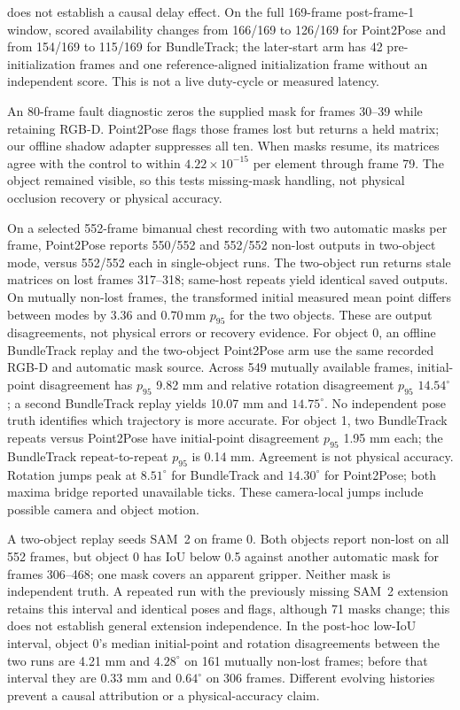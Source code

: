 \documentclass[10pt,journal]{IEEEtran}
\begin{document}
does not establish a causal delay effect. On the full 169-frame post-frame-1 window, scored availability changes from 166/169 to 126/169 for Point2Pose and from 154/169 to 115/169 for BundleTrack; the later-start arm has 42 pre-initialization frames and one reference-aligned initialization frame without an independent score. This is not a live duty-cycle or measured latency.

An 80-frame fault diagnostic zeros the supplied mask for frames 30--39 while retaining RGB-D. Point2Pose flags those frames lost but returns a held matrix; our offline shadow adapter suppresses all ten. When masks resume, its matrices agree with the control to within $4.22\times10^{-15}$ per element through frame 79. The object remained visible, so this tests missing-mask handling, not physical occlusion recovery or physical accuracy.

On a selected 552-frame bimanual chest recording with two automatic masks per frame, Point2Pose reports 550/552 and 552/552 non-lost outputs in two-object mode, versus 552/552 each in single-object runs. The two-object run returns stale matrices on lost frames 317--318; same-host repeats yield identical saved outputs. On mutually non-lost frames, the transformed initial measured mean point differs between modes by $3.36$ and $0.70\,\mathrm{mm}$ $p_{95}$ for the two objects. These are output disagreements, not physical errors or recovery evidence. For object 0, an offline BundleTrack replay and the two-object Point2Pose arm use the same recorded RGB-D and automatic mask source. Across 549 mutually available frames, initial-point disagreement has $p_{95}$ 9.82 mm and relative rotation disagreement $p_{95}$ $14.54^\circ$; a second BundleTrack replay yields 10.07 mm and $14.75^\circ$. No independent pose truth identifies which trajectory is more accurate. For object 1, two BundleTrack repeats versus Point2Pose have initial-point disagreement $p_{95}$ 1.95 mm each; the BundleTrack repeat-to-repeat $p_{95}$ is 0.14 mm. Agreement is not physical accuracy. Rotation jumps peak at $8.51^\circ$ for BundleTrack and $14.30^\circ$ for Point2Pose; both maxima bridge reported unavailable ticks. These camera-local jumps include possible camera and object motion.

A two-object replay seeds SAM~2 on frame 0. Both objects report non-lost on all 552 frames, but object 0 has IoU below 0.5 against another automatic mask for frames 306--468; one mask covers an apparent gripper. Neither mask is independent truth. A repeated run with the previously missing SAM~2 extension retains this interval and identical poses and flags, although 71 masks change; this does not establish general extension independence. In the post-hoc low-IoU interval, object 0's median initial-point and rotation disagreements between the two runs are 4.21 mm and $4.28^\circ$ on 161 mutually non-lost frames; before that interval they are 0.33 mm and $0.64^\circ$ on 306 frames. Different evolving histories prevent a causal attribution or a physical-accuracy claim.
\end{document}
